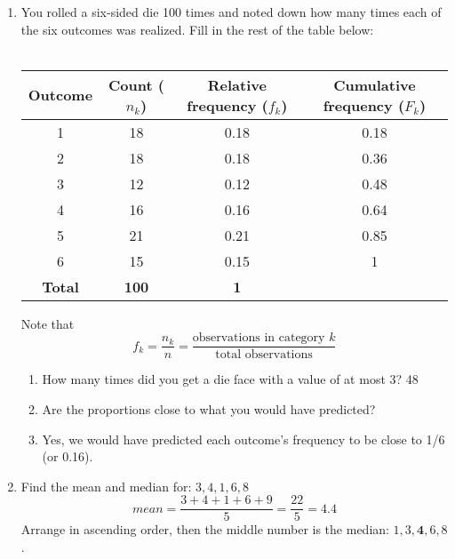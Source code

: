\documentclass{./../../Latex/handout}
\begin{document}
\thispagestyle{plain}
\begin{center}
\end{center}	

\begin{enumerate}
\item You rolled a six-sided die 100 times and noted down how many times each of the six outcomes was realized. Fill in the rest of the table below: \\~\\
\begin{tabular}{c|c|c|c}
Outcome & Count ($n_k$) & Relative frequency ($f_k$) & Cumulative frequency ($F_k$) \\
\hline
1 &  18 & 0.18 & 0.18 \\
\hline
2 & 18 & 0.18 & 0.36 \\
\hline
3 & 12 & 0.12 & 0.48 \\
\hline
4 & 16 & 0.16 & 0.64 \\
\hline
5 & 21 & 0.21 & 0.85 \\
\hline
6 & 15 & 0.15 & 1 \\
\hline
\textbf{Total} & \textbf{100} & \textbf{1} & \\
\hline
\end{tabular}
\vspace{0.5em}

Note that $$ f_k = \frac{n_k}{n} = \frac{\text{observations in category $k$}}{\text{total observations}} $$

\begin{enumerate}
	\item How many times did you get a die face with a value of at most 3? 48 \\ 
	\item Are the proportions close to what you would have predicted? 
\item[] Yes, we would have predicted each outcome's frequency to be close to 1/6 (or 0.16).
\end{enumerate}

\item Find the mean and median for: $ 3, 4, 1, 6, 8 $
$$ mean = \frac{3+4+1+6+9}{5} = \frac{22}{5} = 4.4 $$
Arrange in ascending order, then the middle number is the median: $ 1, 3, \mathbf{4}, 6, 8$.


\end{enumerate}
\end{document}
